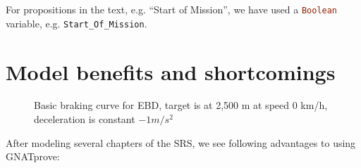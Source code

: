 \documentclass{template/openetcs_report}
\newcommand{\Ada}[1]{\lstinline[language=Ada,basicstyle={\sffamily},framesep=0pt]{#1}}
\begin{document}
For propositions in the text, e.g. ``Start of Mission'', we have used
a \Ada{Boolean} variable, e.g. \Ada{Start_Of_Mission}.

\chapter{Model benefits and shortcomings}

\begin{figure}[htbp]
  \centering
  \caption{Basic braking curve for EBD, target is at 2,500 m at speed
    0 km/h, deceleration is constant $-1 m/s^2$}
  \label{fig:braking-curve}
\end{figure}

After modeling several chapters of the SRS, we see following
advantages to using GNATprove:
\end{document}
